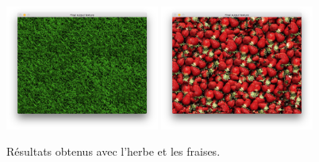 \documentclass[a4paper, 12pt]{article}
\begin{document}
\begin{figure}
\begin{center}
        \null\hfill
        \includegraphics[width=0.45\textwidth]{images/grass_output}
        \hfill\hfill
        \includegraphics[width=0.45\textwidth]{images/strawberries_output}
        \hfill\null
    \end{center}
    \caption{Résultats obtenus avec l'herbe et les fraises.\label{results}}
\end{figure}
\end{document}
